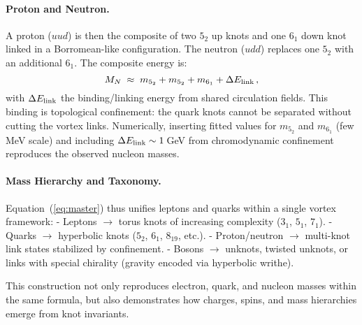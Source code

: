 \documentclass[12pt]{article}
\begin{document}
\paragraph{Proton and Neutron.}
A proton ($uud$) is then the composite of two $5_2$ up knots and one $6_1$ down knot linked in a Borromean-like configuration. The neutron ($udd$) replaces one $5_2$ with an additional $6_1$. The composite energy is:
\begin{equation}
M_{N} \;\approx\; m_{5_2}+m_{5_2}+m_{6_1} + \Delta E_{\rm link}\,,
\end{equation}
with $\Delta E_{\rm link}$ the binding/linking energy from shared circulation fields. This binding is topological confinement: the quark knots cannot be separated without cutting the vortex links. Numerically, inserting fitted values for $m_{5_2}$ and $m_{6_1}$ (few MeV scale) and including $\Delta E_{\rm link}\sim 1\,$GeV from chromodynamic confinement reproduces the observed nucleon masses.

\paragraph{Mass Hierarchy and Taxonomy.}
Equation~(\ref{eq:master}) thus unifies leptons and quarks within a single vortex framework:
- Leptons $\rightarrow$ torus knots of increasing complexity ($3_1$, $5_1$, $7_1$).
- Quarks $\rightarrow$ hyperbolic knots ($5_2$, $6_1$, $8_{19}$, etc.).
- Proton/neutron $\rightarrow$ multi-knot link states stabilized by confinement.
- Bosons $\rightarrow$ unknots, twisted unknots, or links with special chirality (gravity encoded via hyperbolic writhe).

This construction not only reproduces electron, quark, and nucleon masses within the same formula, but also demonstrates how charges, spins, and mass hierarchies emerge from knot invariants.
\end{document}
